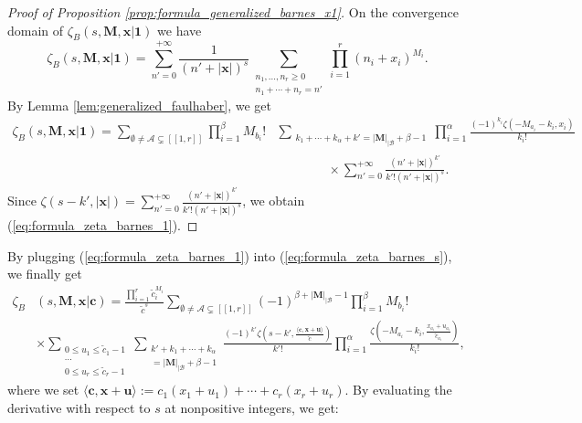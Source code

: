 \documentclass[a4paper]{amsart}
\theoremstyle{remark}
\theoremstyle{definition}
\begin{document}
\begin{proof}[Proof of Proposition \ref{prop:formula_generalized_barnes_x1}]
On the convergence domain of $\zeta_B(s,\mathbf{M},\mathbf{x}|\mathbf{1})$ we have 
$$ \zeta_B(s,\mathbf{M},\mathbf{x}|\mathbf{1}) = \sum_{n'=0}^{+\infty} \frac{1}{(n'+|\mathbf{x}|)^s} \sum_{\substack{n_1,\ldots,n_r \geq 0 \\ n_1+\cdots+n_r=n'}} \prod_{i=1}^r (n_i+x_i)^{M_i}.$$
By Lemma \ref{lem:generalized_faulhaber}, we get
\begin{align*}
    \zeta_B(s,\mathbf{M},\mathbf{x}|\mathbf{1}) = \sum_{\emptyset \neq \mathcal{A} \subsetneq [\![ 1,r]\!]} \prod_{i=1}^{\beta} M_{b_i}! & \sum_{\substack{k_1+\cdots+k_{\alpha}+k'=|\mathbf{M}|_{|\mathcal{B}}+\beta-1}} \prod_{i=1}^{\alpha} \frac{(-1)^{k_i}\zeta(-M_{a_i}-k_i,x_i)}{k_i!} \\
    & \qquad \qquad \times \sum_{n'=0}^{+\infty} \frac{(n'+|\mathbf{x}|)^{k'}}{k'!(n'+|\mathbf{x}|)^s}.
\end{align*}
Since $\zeta(s-k',|\mathbf{x}|)=\sum_{n'=0}^{+\infty} \frac{(n'+|\mathbf{x}|)^{k'}}{k'!(n'+|\mathbf{x}|)^s}$, we obtain (\ref{eq:formula_zeta_barnes_1}).
\end{proof}

By plugging (\ref{eq:formula_zeta_barnes_1}) into (\ref{eq:formula_zeta_barnes_s}), we finally get
\begin{align*}
    \zeta_B&(s,\mathbf{M},\mathbf{x}|\mathbf{c}) = \frac{\prod_{i=1}^r \tilde{c}_i^{M_i}}{\tilde{c}^{s}} \sum_{\emptyset \neq \mathcal{A} \subsetneq [\![1,r]\!]} (-1)^{\beta+|\mathbf{M}|_{|\mathcal{B}}-1} \prod_{i=1}^{\beta} M_{b_i}!  \\
    & \times \sum_{\substack{0 \leq u_1 \leq \tilde{c}_1-1 \\ \cdots \\ 0 \leq u_r \leq \tilde{c}_r-1}} \sum_{\substack{k'+k_1+\cdots+k_{\alpha} \\ =|\mathbf{M}|_{|\mathcal{B}}+\beta-1}} \frac{(-1)^{k'}\zeta\left(s-k',\frac{\langle\mathbf{c},\mathbf{x}+\mathbf{u}\rangle}{\tilde{c}} \right)}{k'!} \prod_{i=1}^{\alpha} \frac{\zeta \left( -M_{a_i}-k_i,\frac{x_{a_i}+u_{a_i}}{\tilde{c}_{a_i}} \right)}{k_i!},
\end{align*}
where we set $\langle \mathbf{c},\mathbf{x}+\mathbf{u} \rangle:=c_1(x_1+u_1)+\cdots+c_r(x_r+u_r)$. By evaluating the derivative with respect to $s$ at nonpositive integers, we get:
\end{document}
